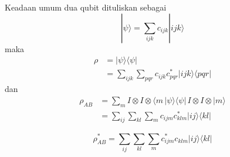 Keadaan umum dua qubit dituliskan sebagai
\begin{equation}
	|\psi\rangle
	= \sum_{i j k} c_{i j k} | i j k \rangle
\end{equation}
maka
\begin{equation}
	\begin{aligned}
		\rho
		&= |\psi\rangle \langle \psi| \\
		&= \sum_{i j k} \sum_{p q r}
		c_{i j k} c^{*}_{p q r}
		| i j k \rangle \langle p q r |
	\end{aligned}
\end{equation}
dan
\begin{equation}
	\begin{aligned}
		\rho_{AB}
		&= \sum_m I \otimes I \otimes \langle m 
		\, |\psi\rangle \langle \psi | \,
		I \otimes I \otimes | m \rangle \\
		&= \sum_{i j} \sum_{k l}\sum_m
		c_{i j m} c^{*}_{k l m}
		| i j \rangle \langle k l |
	\end{aligned}
\end{equation}

\begin{equation}
	\rho^{*}_{AB}
	= \sum_{i j} \sum_{k l} \sum_m
	c^{*}_{i j m} c_{k l m}
	| i j \rangle \langle k l |
\end{equation}

